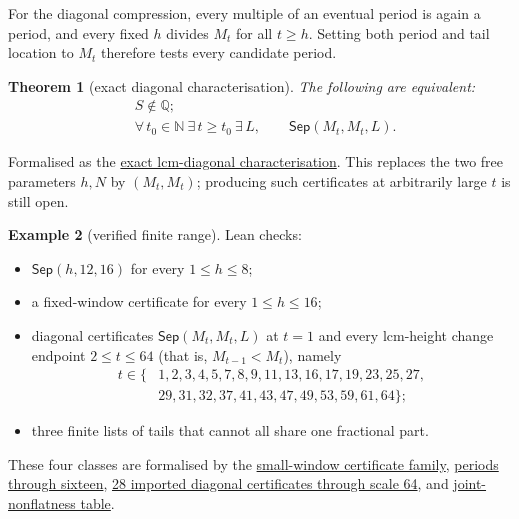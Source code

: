 \documentclass[11pt]{article}
\newcommand{\commit}{bb4e24651b37cd096d3749ef299c3317930b3a3b}
\newcommand{\repobase}{https://github.com/wcook04/plectis-lean-erdos249-257/blob/\commit}
\newcommand{\PK}{Erdos249257}
\newcommand{\lword}[4]{\href{\repobase/\PK/#1\#L#2}{#4}}
\newtheorem{theorem}{Theorem}[section]
\theoremstyle{definition}
\newtheorem{example}[theorem]{Example}
\theoremstyle{remark}
\newcommand{\N}{\mathbb{N}}
\newcommand{\Q}{\mathbb{Q}}
\begin{document}
For the diagonal compression, every multiple of an eventual period is again
a period, and every fixed \(h\) divides \(M_t\) for all \(t\geq h\).  Setting
both period and tail location to \(M_t\) therefore tests every candidate period.

\begin{theorem}[exact diagonal characterisation]\label{res:diag}
The following are equivalent:
\[
\begin{aligned}
 &S\notin\Q;\\
 &\forall\,t_0\in\N\ \exists\,t\geq t_0\ \exists\,L,\qquad
   \mathsf{Sep}(M_t,M_t,L).
\end{aligned}
\]
\end{theorem}
\noindent Formalised as the
\lword{LcmConeFlatness.lean}{426}{irrational_totient_series_iff_lcm_diagonal_certificate_supply}{exact lcm-diagonal characterisation}.
This replaces the two free parameters \(h,N\) by \((M_t,M_t)\);
producing such certificates at arbitrarily large \(t\) is still open.

\begin{example}[verified finite range]\label{res:deposits}
Lean checks:
\begin{itemize}[leftmargin=1.4em]
\item $\mathsf{Sep}(h,12,16)$ for every $1\le h\le8$;
\item a fixed-window certificate for every $1\le h\le16$;
\item diagonal certificates $\mathsf{Sep}(M_t,M_t,L)$ at $t=1$ and every
lcm-height change endpoint $2\le t\le64$ (that is, $M_{t-1}<M_t$), namely
\[
\begin{aligned}
t\in\{&1,2,3,4,5,7,8,9,11,13,16,17,19,23,25,27,\\
      &29,31,32,37,41,43,47,49,53,59,61,64\};
\end{aligned}
\]
\item three finite lists of tails that cannot all share one fractional part.
\end{itemize}
\end{example}
\noindent These four classes are formalised by the
\lword{TotientTailPeriodKiller.lean}{404}{certifiedKill_all_small}{small-window certificate family},
\lword{CarrySurvivorExtinction.lean}{574}{certifiedKill_all_upto_sixteen}{periods through sixteen},
\lword{DiagonalPincerCertificatesT64.lean}{1967}{certifiedKill_diagonal_all_imported_through_t64}{28 imported diagonal certificates through scale 64},
and
\lword{LcmConeNonflat.lean}{506}{coneNonflatCert_cells}{joint-nonflatness table}.
\end{document}
